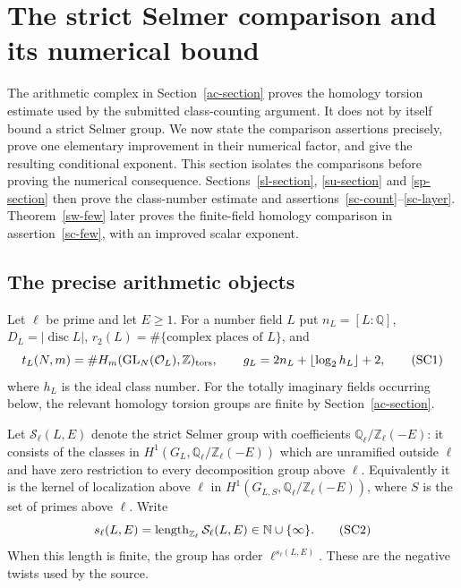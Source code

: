 \section{The strict Selmer comparison and its numerical bound}
\label{sc-section}

The arithmetic complex in Section~\ref{ac-section} proves the
homology torsion estimate used by the submitted class-counting
argument.  It does not by itself bound a strict Selmer group.
We now state the comparison assertions precisely,
prove one elementary improvement in their numerical factor,
and give the resulting conditional exponent.
This section isolates the comparisons before proving the numerical
consequence. Sections~\ref{sl-section}, \ref{su-section} and \ref{sp-section} then prove
the class-number estimate and assertions~\ref{sc-count}--\ref{sc-layer}.
Theorem~\ref{sw-few} later proves the finite-field homology
comparison in assertion~\ref{sc-few}, with an improved scalar exponent.

\subsection{The precise arithmetic objects}

Let $\ell$ be prime and let $E\ge1$.  For a number field $L$
put $n_L=[L:\mathbb Q]$, $D_L=|\operatorname{disc}L|$,
$r_2(L)=\#\{\text{complex places of }L\}$, and
\[
 t_L(N,m)=\#H_m(\operatorname{GL}_N(\mathcal O_L),
                       \mathbb Z)_{\rm tors},
 \qquad
 g_L=2n_L+\lfloor\log_2 h_L\rfloor+2,
 \tag{SC1}
\]
where $h_L$ is the ideal class number.
For the totally imaginary fields occurring below, the relevant
homology torsion groups are finite by Section~\ref{ac-section}.

Let $\mathcal S_\ell(L,E)$ denote the strict Selmer group with
coefficients $\mathbb Q_\ell/\mathbb Z_\ell(-E)$: it consists
of the classes in $H^1(G_L,\mathbb Q_\ell/\mathbb Z_\ell(-E))$
which are unramified outside $\ell$ and have zero restriction
to every decomposition group above $\ell$.
Equivalently it is the kernel of localization above $\ell$
in $H^1(G_{L,S},\mathbb Q_\ell/\mathbb Z_\ell(-E))$,
where $S$ is the set of primes above $\ell$.
Write
\[
       s_\ell(L,E)=
       \operatorname{length}_{\mathbb Z_\ell}\mathcal S_\ell(L,E)
             \in\mathbb N\cup\{\infty\}.
       \tag{SC2}
\]
When this length is finite, the group has order
$\ell^{s_\ell(L,E)}$.
These are the negative twists used by the source.

